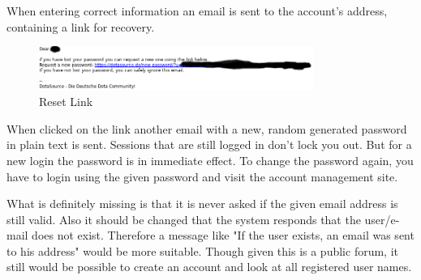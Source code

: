 When entering correct information an email is sent to the account's address, containing a link for recovery.

\begin{figure}[H]
	\centering
	\includegraphics[width=0.8\textwidth]{Assignment0x01/image/email_with_request_link_blacked}
	\caption{Reset Link} \label{img:link_blacked}
\end{figure}

When clicked on the link another email with a new, random generated password in plain text is sent.
Sessions that are still logged in don't lock you out. But for a new login the password is in immediate effect.
To change the password again, you have to login using the given password and visit the account management site.

What is definitely missing is that it is never asked if the given email address is still valid. Also it should be changed that the system responds that the user/e-mail does not exist. Therefore a message like "If the user exists, an email was sent to his address" would be more suitable. Though given this is a public forum, it still would be possible to create an account and look at all registered user names.
